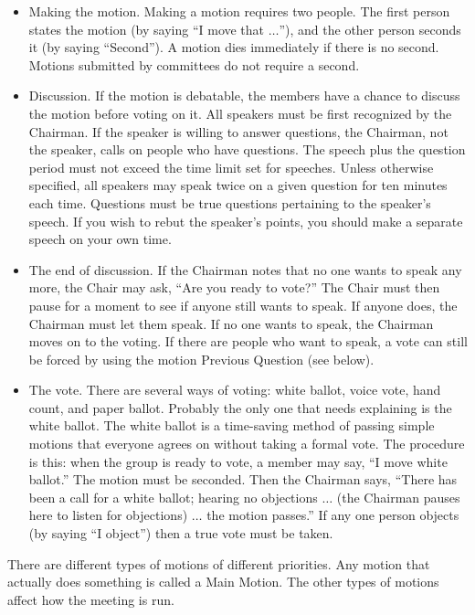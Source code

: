 \begin{itemize}
\item
Making the motion.  Making a motion requires two people.  The first
person states the motion (by saying ``I move that $\ldots$''), and the
other person seconds it (by saying ``Second'').
A motion dies immediately if there is no second.
Motions submitted by committees do not require a second.
\item
Discussion.  If the motion is debatable, the members have a chance to
discuss the motion before voting on it.  All speakers must be first
recognized by the Chairman.  If the speaker is willing to answer
questions, the Chairman, not the speaker, calls on people who have
questions.  The speech plus the question period must not exceed the
time limit set for speeches.
Unless otherwise specified, all speakers may speak twice on a given
question for ten minutes each time.
Questions must be true questions
pertaining to the speaker's speech.  If you wish to rebut the
speaker's points, you should make a separate speech on your own time.
\item
The end of discussion.  If the Chairman notes that no one wants to
speak any more, the Chair may ask, ``Are you ready to vote?''  The Chair
must then pause for a moment to see if anyone still wants to speak.
If anyone does, the Chairman must let them speak.  If no one wants to
speak, the Chairman moves on to the voting.  If there are
people who want to speak, a vote can still be forced by using the
motion Previous Question (see below).
\item
The vote.  There are several ways of voting: white ballot, voice vote,
hand count, and paper ballot.  Probably the only one that needs
explaining is the white ballot.  The white ballot is a time-saving
method of passing simple motions that everyone agrees on without
taking a formal vote.  The procedure is this:  when the group is ready
to vote, a member may say, ``I move white ballot.''  The motion must
be seconded.  Then the Chairman says, ``There has been a call for a
white ballot; hearing no objections $\ldots$ (the Chairman pauses here
to listen for objections) $\ldots$ the motion passes.''  If any one
person objects (by saying ``I object'') then a true vote must be
taken.
\end{itemize}

There are different types of motions of different priorities.  Any
motion that actually does something is called a Main Motion.  The
other types of motions affect how the meeting is run.

